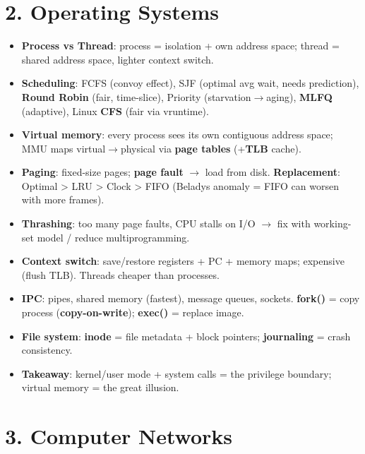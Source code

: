 \documentclass[11pt]{article}
\providecommand{\tightlist}{\setlength{\itemsep}{1pt}\setlength{\parskip}{0pt}}
\begin{document}
\section{2. Operating Systems}\label{2-operating-systems}

\begin{itemize}
\tightlist
\item
  \textbf{Process vs Thread}: process = isolation + own address space; thread = shared address space, lighter context switch.
\item
  \textbf{Scheduling}: FCFS (convoy effect), SJF (optimal avg wait, needs prediction), \textbf{Round Robin} (fair, time-slice), Priority (starvation\(\rightarrow\)aging), \textbf{MLFQ} (adaptive), Linux \textbf{CFS} (fair via vruntime).
\item
  \textbf{Virtual memory}: every process sees its own contiguous address space; MMU maps virtual\(\rightarrow\)physical via \textbf{page tables} (+\textbf{TLB} cache).
\item
  \textbf{Paging}: fixed-size pages; \textbf{page fault} \(\rightarrow\) load from disk. \textbf{Replacement}: Optimal \textgreater{} LRU \textgreater{} Clock \textgreater{} FIFO (Belady\textquotesingle s anomaly = FIFO can worsen with more frames).
\item
  \textbf{Thrashing}: too many page faults, CPU stalls on I/O \(\rightarrow\) fix with working-set model / reduce multiprogramming.
\item
  \textbf{Context switch}: save/restore registers + PC + memory maps; expensive (flush TLB). Threads cheaper than processes.
\item
  \textbf{IPC}: pipes, shared memory (fastest), message queues, sockets. \textbf{fork()} = copy process (\textbf{copy-on-write}); \textbf{exec()} = replace image.
\item
  \textbf{File system}: \textbf{inode} = file metadata + block pointers; \textbf{journaling} = crash consistency.
\item
  \textbf{Takeaway}: kernel/user mode + system calls = the privilege boundary; virtual memory = the great illusion.
\end{itemize}

\section{3. Computer Networks}\label{3-computer-networks}
\end{document}
